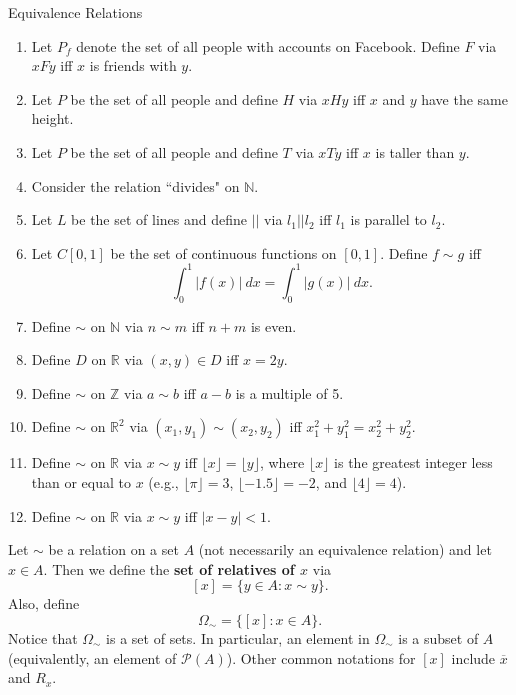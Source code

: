 \begin{section}{Equivalence Relations}
\begin{exercise}
\begin{enumerate}[label=\textrm{(\alph*)}]
\item\label{exer:facebook} Let $P_f$ denote the set of all people with accounts on Facebook.  Define  $F$ via $xFy$ iff $x$ is friends with $y$. 
\item Let $P$ be the set of all people and define $H$ via $xHy$ iff $x$ and $y$ have the same height.
\item Let $P$ be the set of all people and define $T$ via $xTy$ iff $x$ is taller than $y$.
\item Consider the relation ``divides" on $\mathbb{N}$.
\item Let $L$ be the set of lines and define $||$ via $l_1||l_2$ iff $l_1$ is parallel to $l_2$.
\item Let $C[0,1]$ be the set of continuous functions on $[0,1]$.  Define $f\sim g$ iff
\[
\int_0^1|f(x)|\ dx=\int_0^1|g(x)|\ dx.
\]
\item Define $\sim$ on $\mathbb{N}$ via $n\sim m$ iff $n+m$ is even.
\item Define $D$ on $\mathbb{R}$ via $(x,y)\in D$ iff $x=2y$.
\item\label{exer:mod 5} Define $\sim$ on $\mathbb{Z}$ via $a\sim b$ iff $a-b$ is a multiple of 5.
\item Define $\sim$ on $\mathbb{R}^2$ via $(x_1,y_1)\sim (x_2,y_2)$ iff $x_1^2+y_1^2=x_2^2+y_2^2$.
\item Define $\sim$ on $\mathbb{R}$ via $x\sim y$ iff $\lfloor x\rfloor =\lfloor y\rfloor$, where $\lfloor x\rfloor$ is the greatest integer less than or equal to $x$ (e.g., $\lfloor \pi\rfloor=3$, $\lfloor -1.5\rfloor=-2$, and $\lfloor 4\rfloor=4$).
\item Define $\sim$ on $\mathbb{R}$ via $x \sim y$ iff $|x-y|<1$.
\end{enumerate}
\end{exercise}

\begin{definition}
Let $\sim$ be a relation on a set $A$ (not necessarily an equivalence relation) and let $x\in A$.  Then we define the \textbf{set of relatives of $x$} via
\[
[x]=\{y\in A: x\sim y\}.
\]
Also, define
\[
\Omega_{\sim}=\{[x]:x\in A\}.
\]
Notice that $\Omega_{\sim}$ is a set of sets.  In particular, an element in $\Omega_{\sim}$ is a subset of $A$ (equivalently, an element of $\mathcal{P}(A)$).  Other common notations for $[x]$ include $\overline{x}$ and $R_x$.
\end{definition}


\end{section}
